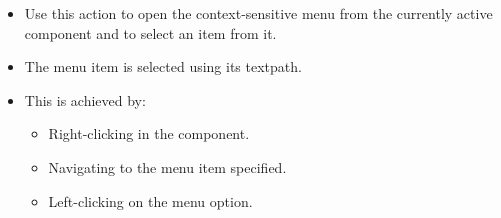 
\begin{itemize}
\item Use this action to open the context-sensitive menu from the currently active component and to select an item from it.
\item The menu item is selected using its textpath. 
\item This is achieved by:
\begin{itemize}
\item Right-clicking in the component.
\item Navigating to the menu item specified.
\item Left-clicking on the menu option.  
\end{itemize}


\end{itemize}

  

  
